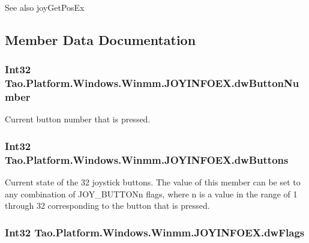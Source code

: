 \begin{DoxySeeAlso}{See also}
joyGetPosEx


\end{DoxySeeAlso}


\subsection{Member Data Documentation}
\hypertarget{struct_tao_1_1_platform_1_1_windows_1_1_winmm_1_1_j_o_y_i_n_f_o_e_x_a43c8fb6923edc2db4d3c7e03c2e03a1a}{
\subsubsection[{dwButtonNumber}]{\setlength{\rightskip}{0pt plus 5cm}Int32 {\bf Tao.Platform.Windows.Winmm.JOYINFOEX.dwButtonNumber}}}
\label{struct_tao_1_1_platform_1_1_windows_1_1_winmm_1_1_j_o_y_i_n_f_o_e_x_a43c8fb6923edc2db4d3c7e03c2e03a1a}


Current button number that is pressed. 

\hypertarget{struct_tao_1_1_platform_1_1_windows_1_1_winmm_1_1_j_o_y_i_n_f_o_e_x_aa72d8cb67ca3577d94cee15fca075291}{
\subsubsection[{dwButtons}]{\setlength{\rightskip}{0pt plus 5cm}Int32 {\bf Tao.Platform.Windows.Winmm.JOYINFOEX.dwButtons}}}
\label{struct_tao_1_1_platform_1_1_windows_1_1_winmm_1_1_j_o_y_i_n_f_o_e_x_aa72d8cb67ca3577d94cee15fca075291}


Current state of the 32 joystick buttons. The value of this member can be set to any combination of JOY\_\-BUTTONn flags, where n is a value in the range of 1 through 32 corresponding to the button that is pressed. 

\hypertarget{struct_tao_1_1_platform_1_1_windows_1_1_winmm_1_1_j_o_y_i_n_f_o_e_x_a1226a7ab8953fbb4ee49aeb6f4b770d3}{
\subsubsection[{dwFlags}]{\setlength{\rightskip}{0pt plus 5cm}Int32 {\bf Tao.Platform.Windows.Winmm.JOYINFOEX.dwFlags}}}
\label{struct_tao_1_1_platform_1_1_windows_1_1_winmm_1_1_j_o_y_i_n_f_o_e_x_a1226a7ab8953fbb4ee49aeb6f4b770d3}


